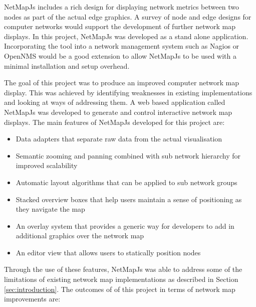 \documentclass[11pt, a4paper]{article}
\begin{document}
NetMapJs includes a rich design for displaying network metrics between two nodes
as part of the actual edge graphics. A survey of node and edge designs for
computer networks would support the development of further network map displays.
In this project, NetMapJs was developed as a stand alone application.
Incorporating the tool into a network management system such as
Nagios \cite{Nagios_website} or OpenNMS \cite{OpenNMS_website} would be a good
extension to allow NetMapJs to be used with a minimal installation and setup
overhead.



The goal of this project was to produce an improved computer network map
display. This was achieved by identifying weaknesses in existing implementations
and looking at ways of addressing them. A web based application called NetMapJs
was developed to generate and control interactive network map displays. The main
features of NetMapJs developed for this project are:

\begin{itemize}
  \item Data adapters that separate raw data from the actual visualisation
  \item Semantic zooming and panning combined with sub network hierarchy for
  improved scalability
  \item Automatic layout algorithms that can be applied to sub network groups
  \item Stacked overview boxes that help users maintain a sense of positioning
  as they navigate the map
  \item An overlay system that provides a generic way for developers to add in
  additional graphics over the network map
  \item An editor view that allows users to statically position nodes
\end{itemize}

Through the use of these features, NetMapJs was able to address some of the
limitations of existing network map implementations as described in Section
\ref{sec:introduction}. The outcomes of of this project in terms of network map
improvements are:
\end{document}
